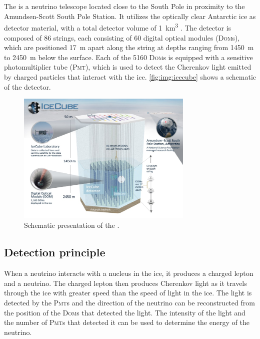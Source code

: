 \section{\icecube{}}
The \icecubeneutrinoobservatory{} is a neutrino telescope
  located close to the South Pole
  in proximity to the Amundsen-Scott South Pole Station.
It utilizes the optically clear Antarctic ice as detector material,
  with a total detector volume of \SI{1}{\cubic\kilo\meter} \cite{icecube_facts}.
The detector is composed of \num{86} strings,
  each consisting of \num{60} digital optical modules (\textsc{Dom}s),
    which are positioned
      \SI{17}{\meter} apart along the string
      at depths ranging from \SI{1450}{\meter} to \SI{2450}{\meter} below the surface.
Each of the \num{5160} \textsc{Dom}s is equipped with a sensitive photomultiplier tube (\textsc{Pmt}),
  which is used to detect the Cherenkov light emitted by charged particles
  that interact with the ice.
%
\autoref{fig:img:icecube} shows a schematic of the \icecube{} detector.



\begin{figure}
  \centering
  \includegraphics[width=0.75\textwidth]{content/img/icecube_detector_schematic.jpg}
  \caption{
    Schematic presentation of the \icecubeneutrinoobservatory{}. \cite{icecube_homepage}
  }
  \label{fig:img:icecube}
\end{figure}


\subsection{Detection principle}
When a neutrino interacts with a nucleus in the ice,
it produces a charged lepton and a neutrino.
The charged lepton then produces Cherenkov light
  as it travels through the ice
    with greater speed than the speed of light in the ice.
The light is detected by the \textsc{Pmt}s
  and the direction of the neutrino can be reconstructed
  from the position of the \textsc{Dom}s that detected the light.
The intensity of the light and the number of \textsc{Pmt}s that detected it
  can be used to determine the energy of the neutrino.

